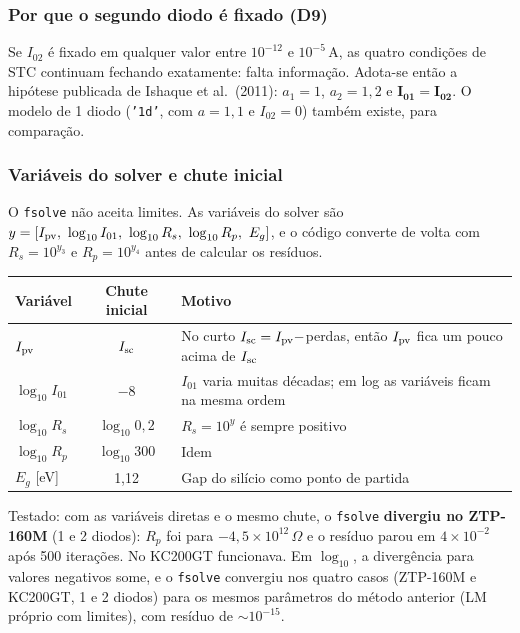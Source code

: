 \subsubsection{Por que o segundo diodo \'e fixado (D9)}

Se $I_{02}$ \'e fixado em qualquer valor entre $10^{-12}$ e $10^{-5}$\,A, as quatro condi\c{c}\~oes
de STC continuam fechando exatamente: falta informa\c{c}\~ao. Adota-se ent\~ao a hip\'otese
publicada de Ishaque et al.\ (2011): $a_1=1$, $a_2=1{,}2$ e $\boldsymbol{I_{01}=I_{02}}$. O modelo
de 1 diodo (\texttt{'1d'}, com $a=1{,}1$ e $I_{02}=0$) tamb\'em existe, para compara\c{c}\~ao.

\subsubsection{Vari\'aveis do solver e chute inicial}

O \texttt{fsolve} n\~ao aceita limites. As vari\'aveis do solver s\~ao $y=[\Ipv,\ \log_{10}I_{01},\ \log_{10}R_s,\ \log_{10}R_p,\ E_g]$,
e o c\'odigo converte de volta com $R_s=10^{y_3}$ e $R_p=10^{y_4}$ antes de calcular os res\'iduos.

\begin{center}\small
\begin{tabular}{@{}lcp{7.6cm}@{}}
\toprule
Vari\'avel & Chute inicial & Motivo \\ \midrule
$I_{\mathrm{pv}}$ & $I_{\mathrm{sc}}$ & No curto $I_{\mathrm{sc}}=I_{\mathrm{pv}}-$perdas, ent\~ao $I_{\mathrm{pv}}$ fica um pouco acima de $I_{\mathrm{sc}}$ \\
$\log_{10}I_{01}$ & $-8$ & $I_{01}$ varia muitas d\'ecadas; em log as vari\'aveis ficam na mesma ordem \\
$\log_{10}R_s$ & $\log_{10}0{,}2$ & $R_s=10^{y}$ \'e sempre positivo \\
$\log_{10}R_p$ & $\log_{10}300$ & Idem \\
$E_g$ [eV] & 1,12 & Gap do sil\'icio como ponto de partida \\
\bottomrule
\end{tabular}
\end{center}

\begin{atencao}
Testado: com as vari\'aveis diretas e o mesmo chute, o \texttt{fsolve} \textbf{divergiu no ZTP-160M} (1 e 2 diodos): $R_p$ foi para $-4{,}5\times10^{12}\,\Omega$ e o
res\'iduo parou em $4\times10^{-2}$ ap\'os 500 itera\c{c}\~oes. No KC200GT funcionava. Em $\log_{10}$, a diverg\^encia para valores negativos some, e o \texttt{fsolve}
convergiu nos quatro casos (ZTP-160M e KC200GT, 1 e 2 diodos) para os mesmos par\^ametros do m\'etodo anterior (LM pr\'oprio com limites), com res\'iduo de $\sim10^{-15}$.
\end{atencao}


